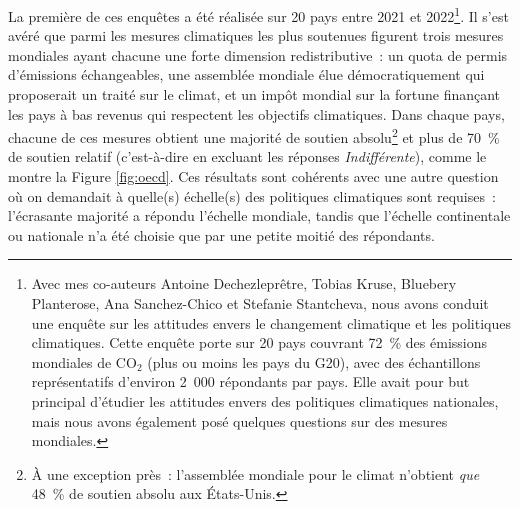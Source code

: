 \documentclass[a5paper,french,openany]{memoir}
\begin{document}
La première de ces enquêtes a été réalisée sur 20 pays %
entre 2021 et 2022\footnote{Avec mes co-auteurs Antoine Dechezleprêtre, Tobias Kruse, Bluebery Planterose, Ana Sanchez-Chico et Stefanie Stantcheva, nous avons conduit une enquête sur les attitudes envers le changement climatique et les politiques climatiques. Cette enquête porte sur 20 pays couvrant 72~\% des émissions mondiales de CO$_\text{2}$ (plus ou moins les pays du G20), avec des échantillons représentatifs d'environ 2~000 répondants par pays. Elle avait pour but principal d'étudier les attitudes envers des politiques climatiques nationales, mais nous avons également posé quelques questions sur des mesures mondiales.}. Il s'est avéré que parmi les mesures climatiques les plus soutenues figurent trois mesures mondiales ayant chacune une forte dimension redistributive~: un quota de permis d'émissions échangeables, une assemblée mondiale élue démocratiquement qui proposerait un traité sur le climat, et un impôt mondial sur la fortune finançant les pays à bas revenus qui respectent les objectifs climatiques. Dans chaque pays, chacune de ces mesures obtient une majorité de soutien absolu\footnote{À une exception près~: l'assemblée mondiale pour le climat n'obtient \textit{que} 48~\% de soutien absolu aux États-Unis.} 
et plus de 70~\% de soutien relatif (c'est-à-dire en excluant les réponses \textit{Indifférent\textperiodcentered{}e}), 
comme le montre la Figure \ref{fig:oecd}. Ces résultats sont cohérents avec une autre question où on demandait à quelle(s) échelle(s) des politiques climatiques sont requises~: %
l'écrasante majorité a répondu l'échelle mondiale, tandis que l'échelle continentale ou nationale n'a été choisie que par une petite moitié des répondants. 
\end{document}
